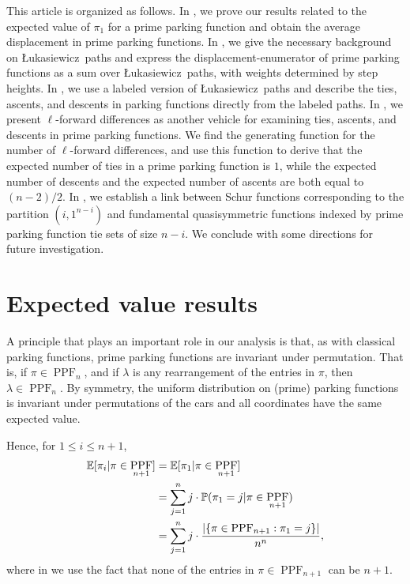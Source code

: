 \documentclass[12pt,reqno]{amsart}
\theoremstyle{definition}
\newcommand{\E}{\mathbb{E}}
\theoremstyle{remark}
\DeclareMathOperator{\PPF}{PPF}
\newcommand{\PR}{\mathbb{P}}
\newcommand{\Luka}{\L ukasiewicz}
\begin{document}
This article is organized as follows. In , we prove our results related to the expected value of $\pi_1$ for a prime parking function and obtain the average displacement in prime parking functions. In , we give the necessary background on \Luka~paths and express the displacement-enumerator of prime parking functions as a sum over \Luka~paths, with weights determined by step heights. 
In , we use a labeled version of \Luka~paths and describe the ties, ascents, and descents in parking functions directly from the labeled paths.
In , we present $\ell$-forward differences as another vehicle for examining ties, ascents, and descents in prime parking functions.  We find the generating function for the number of $\ell$-forward differences, and use this function to derive that the expected number of ties in a prime parking function is $1$, while the expected number of descents and the expected number of ascents are both equal to $(n-2)/2$.  In , we establish a link between Schur functions corresponding to the partition $(i,1^{n-i})$ and fundamental quasisymmetric functions indexed by prime parking function tie sets of size $n-i.$ 
We conclude with some directions for future investigation.

\section{Expected value results}\label{sec:expected value results}


A principle that plays an important role in our analysis is that, as with classical parking functions, prime parking functions are invariant under permutation. 
That is, if $\pi\in\PPF_n$, and if $\lambda$ is any rearrangement
of the entries in $\pi$, then $\lambda \in \PPF_n$.
By symmetry, the uniform distribution on (prime) parking functions is invariant under permutations of the cars and all coordinates have the same expected value.

Hence, for $1\leq i\leq n+1$,
\begin{align}
    \E[\pi_i | \pi \in \PPF_{n+1}]&=\E[\pi_1 | \pi \in \PPF_{n+1}] \notag \\ 
    &=\sum_{j=1}^{n} j\cdot \PR(\pi_1=j|\pi\in \PPF_{n+1})\label{eq:second equality}\\
    &=\sum_{j=1}^n j\cdot \frac{|
    \{\pi\in\PPF_{n+1}:\pi_1=j\}|}{n^{n}}\label{eq:expectedvalue},
\end{align}
where in 
we use the fact that none of the entries in $\pi \in \PPF_{n+1}$ can be $n+1$.
\end{document}
